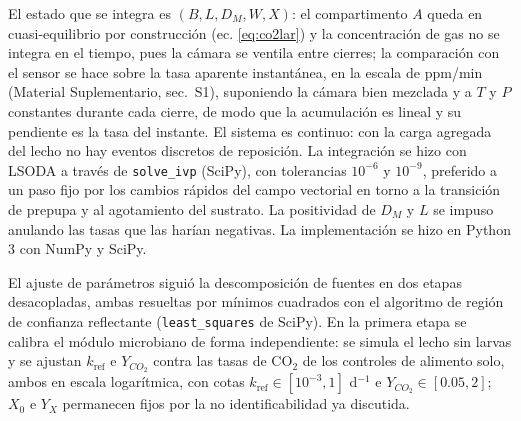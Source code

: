 El estado que se integra es $(B, L, D_M, W, X)$: el compartimento $A$ queda en cuasi-equilibrio por construcción (ec. \ref{eq:co2lar}) y la concentración de gas no se integra en el tiempo, pues la cámara se ventila entre cierres; la comparación con el sensor se hace sobre la tasa aparente instantánea, en la escala de ppm/min (Material Suplementario, sec.~S1), suponiendo la cámara bien mezclada y a $T$ y $P$ constantes durante cada cierre, de modo que la acumulación es lineal y su pendiente es la tasa del instante. El sistema es continuo: con la carga agregada del lecho no hay eventos discretos de reposición. La integración se hizo con LSODA \parencite{petzoldAutomaticSelectionMethods1983} a través de \texttt{solve\_ivp} (SciPy), con tolerancias $10^{-6}$ y $10^{-9}$, preferido a un paso fijo por los cambios rápidos del campo vectorial en torno a la transición de prepupa y al agotamiento del sustrato. La positividad de $D_M$ y $L$ se impuso anulando las tasas que las harían negativas. La implementación se hizo en Python 3 con NumPy y SciPy.

El ajuste de parámetros siguió la descomposición de fuentes en dos etapas desacopladas, ambas resueltas por mínimos cuadrados con el algoritmo de región de confianza reflectante (\texttt{least\_squares} de SciPy).
En la primera etapa se calibra el módulo microbiano de forma independiente: se simula el lecho sin larvas y se ajustan $k_{\mathrm{ref}}$ e $Y_{CO_2}$ contra las tasas de CO$_2$ de los controles de alimento solo, ambos en escala logarítmica, con cotas $k_{\mathrm{ref}} \in [10^{-3}, 1]$ d$^{-1}$ e $Y_{CO_2} \in [0.05, 2]$; $X_0$ e $Y_X$ permanecen fijos por la no identificabilidad ya discutida.

